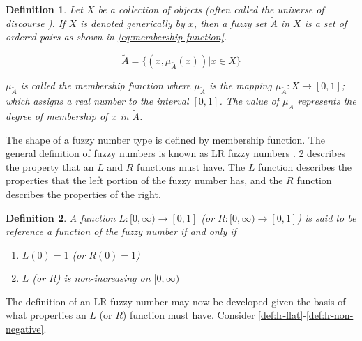 \documentclass[ee,msthesis]{usuthesis}
\newtheorem{definition}{Definition}[section]
\begin{document}
\begin{definition}
\label{def:membership-function}
Let \(X\) be a collection of objects (often called the universe of discourse \cite{bello-2019-fuzzy-activ}). If \(X\) is denoted
generically by \(x\), then a fuzzy set \(\tilde{A}\) in \(X\) is a set of ordered pairs as shown in \ref{eq:membership-function}.

\begin{equation}
\label{eq:membership-function}
\tilde{A} = \{(x, \mu_{\tilde{A}}(x))| x\in X\}
\end{equation}

\noindent
\(\mu_{\tilde{A}}\) is called the membership function where \(\mu_{\tilde{A}}\) is the mapping \(\mu_{\tilde{A}} : X \rightarrow
[0,1]\); which assigns a real number to the interval \([0,1]\). The value of \(\mu_{\tilde{A}}\) represents the degree of
membership of \(x\) in \(\tilde{A}\).
\end{definition}

The shape of a fuzzy number type is defined by membership function. The general definition of fuzzy numbers is known as
LR fuzzy numbers \cite{kaur-2016-introd-fuzzy,zimmermann-2001-fuzzy-set}. \ref{def:reference-function} describes the
property that an \(L\) and \(R\) functions must have. The \(L\) function describes the properties that the left portion of the
fuzzy number has, and the \(R\) function describes the properties of the right.

\begin{definition}
\label{def:reference-function}
A function \(L:[0,\infty) \rightarrow [0,1]\) (or \(R:[0,\infty) \rightarrow [0,1]\)) is said to be reference a function of the fuzzy number if and only
if

\begin{enumerate}
\item \(L(0) = 1\) (or \(R(0) = 1\))
\item \(L\) (or \(R\)) is non-increasing on \([0,\infty)\)
\end{enumerate}
\end{definition}

The definition of an LR fuzzy number may now be developed given the basis of what properties an \(L\) (or \(R\)) function
must have. Consider \ref{def:lr-flat}-\ref{def:lr-non-negative}.
\end{document}
